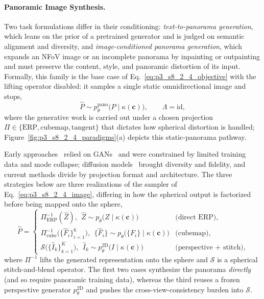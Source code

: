 \paragraph{Panoramic Image Synthesis.}
Two task formulations differ in their conditioning: \emph{text-to-panorama generation}, which leans on the prior of a pretrained generator and is judged on semantic alignment and diversity, and \emph{image-conditioned panorama generation}, which expands an NFoV image or an incomplete panorama by inpainting or outpainting and must preserve the content, style, and panoramic distortion of its input.
Formally, this family is the base case of Eq.~\eqref{eq:p3_s8_2_4_objective} with the lifting operator disabled: it samples a single static omnidirectional image and stops,
\begin{equation}
\hat{P} \sim p_\theta^{\text{pano}}\!\big(P \mid \kappa(\mathbf{c})\big),
\qquad
\Lambda = \mathrm{id},
\label{eq:p3_s8_2_4_image}
\end{equation}
where the generative work is carried out under a chosen projection $\Pi\in\{\text{ERP},\text{cubemap},\text{tangent}\}$ that dictates how spherical distortion is handled; Figure~\ref{fig:p3_s8_2_4_paradigms}(a) depicts this static-panorama pathway.

Early approaches~\cite{chen2022text2light, may2023cubegan} relied on GANs~\cite{goodfellow2014gan} and were constrained by limited training data and mode collapse; diffusion models~\cite{ho2020denoising, rombach2022ldm} brought diversity and fidelity, and current methods divide by projection format and architecture.
The three strategies below are three realizations of the sampler of Eq.~\eqref{eq:p3_s8_2_4_image}, differing in how the spherical output is factorized before being mapped onto the sphere,
\begin{equation}
\hat{P} =
\begin{cases}
\Pi_{\text{ERP}}^{-1}(\hat{Z}),\ \ \hat{Z}\sim p_\theta\big(Z\mid\kappa(\mathbf{c})\big) & \text{(direct ERP)},\\[3pt]
\Pi_{\text{cube}}^{-1}\big(\{\hat{F}_i\}_{i=1}^{6}\big),\ \ \{\hat{F}_i\}\sim p_\theta\big(\{F_i\}\mid\kappa(\mathbf{c})\big) & \text{(cubemap)},\\[3pt]
\mathcal{S}\big(\{\hat{I}_k\}_{k=1}^{K}\big),\ \ \hat{I}_k\sim p_\theta^{\text{2D}}\big(I\mid\kappa(\mathbf{c})\big) & \text{(perspective + stitch)},
\end{cases}
\label{eq:p3_s8_2_4_image_proj}
\end{equation}
where $\Pi^{-1}$ lifts the generated representation onto the sphere and $\mathcal{S}$ is a spherical stitch-and-blend operator. The first two cases synthesize the panorama \emph{directly} (and so require panoramic training data), whereas the third reuses a frozen perspective generator $p_\theta^{\text{2D}}$ and pushes the cross-view-consistency burden into $\mathcal{S}$.

